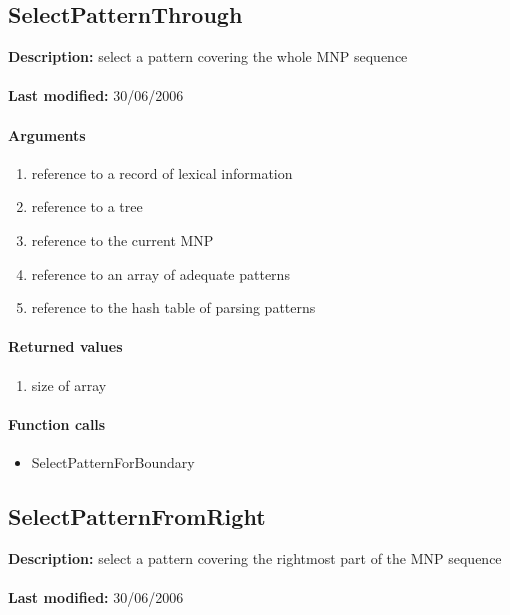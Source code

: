 \subsection{SelectPatternThrough}
\textbf{Description:} select a pattern covering the whole MNP sequence\\
\\\textbf{Last modified:} 30/06/2006

\paragraph{Arguments}
\begin{enumerate}
\item reference to a record of lexical information
\item reference to a tree
\item reference to the current MNP
\item reference to an array of adequate patterns
\item reference to the hash table of parsing patterns
\end{enumerate}

\paragraph{Returned values}
\begin{enumerate}
\item size of array

\end{enumerate}

\paragraph{Function calls}
\begin{itemize}
\item SelectPatternForBoundary
\end{itemize}

\subsection{SelectPatternFromRight}
\textbf{Description:} select a pattern covering the rightmost part of the MNP sequence\\
\\\textbf{Last modified:} 30/06/2006

